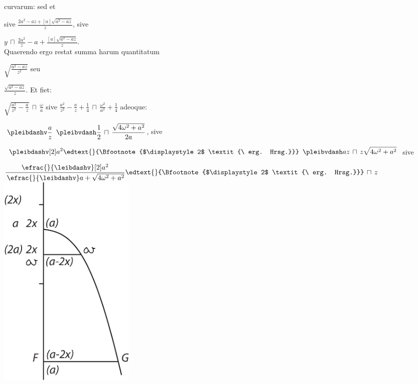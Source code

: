     curvarum: sed et 
\rule[-4mm]{0mm}{10mm} 
sive 
$\displaystyle \frac{2a^2 -az + [a] \sqrt{a^2 - az}}{z}$,
sive
\rule[-4mm]{0mm}{10mm}$\displaystyle y \, \sqcap \, \frac{2a^2}{z} - a + \frac{[a] \sqrt{a^2 - az}}{z}$.\\
\hspace*{7,5mm}
Quaerendo ergo restat summa harum quantitatum 
\rule[-4mm]{0mm}{10mm}$\displaystyle \sqrt{\frac{a^2 - az}{z^2}}$ 
seu 
\rule[-4mm]{0mm}{10mm}$\displaystyle \frac{\sqrt{a^2 - az}}{z}$. 
Et fiet: 
\rule[-4mm]{0mm}{10mm}$\displaystyle \sqrt{\frac{a^2}{z^2} - \frac{a}{z}} \, \sqcap \, \frac{\omega}{a}$ sive $\displaystyle \frac{a^2}{z^2} - \frac{a}{z} + \frac{1}{4} \, \sqcap \, \frac{\omega ^2}{a^2} + \frac{1}{4}$ 
adeoque: 
\rule[-4mm]{0mm}{10mm}$\displaystyle\ \pleibdashv\displaystyle \frac{a}{z} \ \, \pleibvdash\displaystyle \frac{1}{2} \, \sqcap \, \frac{\sqrt{4\omega ^2 + a^2}}{2a}$, 
sive \rule[-4mm]{0mm}{10mm}$\displaystyle\ \pleibdashv\displaystyle [2]a^2\edtext{}{\Bfootnote{$\displaystyle 2$ \textit{\ erg. Hrsg.}}} \ \, \pleibvdash\displaystyle az \, \sqcap \, z \sqrt{4\omega ^2 + a^2}$
sive 
\rule[-4mm]{0mm}{10mm}$\displaystyle \frac{\efrac{}{\leibdashv} [2]a^2}{\, \efrac{}{\leibdashv} a + \sqrt{4\omega ^2 + a^2}}\edtext{}{\Bfootnote{$\displaystyle 2$ \textit{\ erg. Hrsg.}}} \, \sqcap \, z$
\pend
\vspace{1.2em}
\pstart\centering
\includegraphics[trim = 0mm -3mm 0mm 0mm, clip, width=0.29\textwidth]{images/lh0351303_262r-d1.pdf}\\
